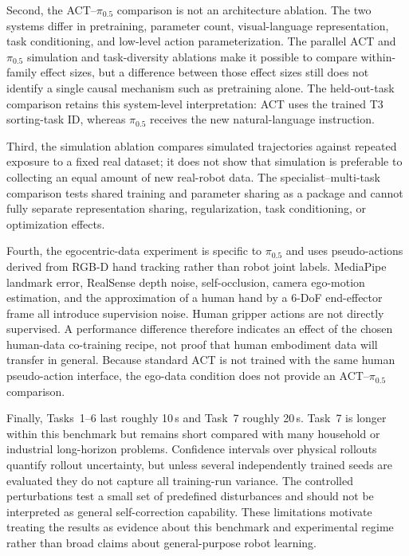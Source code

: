 \documentclass[10pt,conference]{IEEEtran}
\begin{document}
Second, the ACT--$\pi_{0.5}$ comparison is not an architecture ablation. The two
systems differ in pretraining, parameter count, visual-language representation,
task conditioning, and low-level action parameterization. The parallel ACT and
$\pi_{0.5}$ simulation and task-diversity ablations make it possible to compare
within-family effect sizes, but a difference between those effect sizes still
does not identify a single causal mechanism such as pretraining alone.
The held-out-task comparison retains this system-level interpretation: ACT uses
the trained T3 sorting-task ID, whereas $\pi_{0.5}$ receives the new
natural-language instruction.

Third, the simulation ablation compares simulated trajectories against repeated
exposure to a fixed real dataset; it does not show that simulation is preferable
to collecting an equal amount of new real-robot data. The specialist--multi-task
comparison tests shared training and parameter sharing as a package and cannot
fully separate representation sharing, regularization, task conditioning, or
optimization effects.

Fourth, the egocentric-data experiment is specific to $\pi_{0.5}$ and uses
pseudo-actions derived from RGB-D hand tracking rather than robot joint labels.
MediaPipe landmark error, RealSense depth noise, self-occlusion, camera
ego-motion estimation, and the approximation of a human hand by a 6-DoF
end-effector frame all introduce supervision noise. Human gripper actions are
not directly supervised. A performance difference therefore indicates an
effect of the chosen human-data co-training recipe, not proof that human
embodiment data will transfer in general. Because standard ACT is not trained
with the same human pseudo-action interface, the ego-data condition does not
provide an ACT--$\pi_{0.5}$ comparison.

Finally, Tasks~1--6 last roughly 10\,s and Task~7 roughly 20\,s. Task~7 is
longer within this benchmark but remains short compared with many household
or industrial long-horizon problems. Confidence intervals over physical
rollouts quantify rollout uncertainty, but unless several independently trained
seeds are evaluated they do not capture all training-run variance. The
controlled perturbations test a small set of predefined disturbances and should
not be interpreted as general self-correction capability. These limitations
motivate treating the results as evidence about this benchmark and experimental
regime rather than broad claims about general-purpose robot learning.
\end{document}
